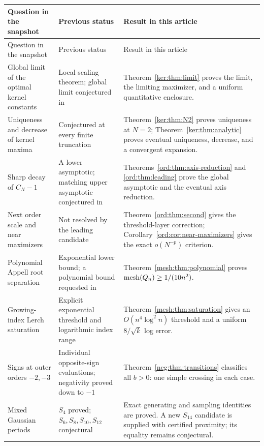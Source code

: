 \begingroup
\small
\renewcommand{\arraystretch}{1.18}
\begin{longtable}{@{}>{\raggedright\arraybackslash}p{}
 >{\raggedright\arraybackslash}p{}
 >{\raggedright\arraybackslash}p{}@{}}
\toprule
Question in the snapshot & Previous status & Result in this article\\
\midrule
\endfirsthead
\toprule
Question in the snapshot & Previous status & Result in this article\\
\midrule
\endhead
Global limit of the optimal kernel constants
& Local scaling theorem; global limit conjectured in
  \cite[Section 8]{IncomingSharp}
& Theorem~\ref{ker:thm:limit} proves the limit, the limiting maximizer,
  and a uniform quantitative enclosure.\\
Uniqueness and decrease of kernel maxima
& Conjectured at every finite truncation
& Theorem~\ref{ker:thm:N2} proves uniqueness at $N=2$;
  Theorem~\ref{ker:thm:analytic} proves eventual uniqueness,
  decrease, and a convergent expansion.\\
Sharp decay of $C_N-1$
& A lower asymptotic; matching upper asymptotic conjectured in
  \cite[Section 9]{IncomingBounds}
& Theorems~\ref{ord:thm:axis-reduction} and
  \ref{ord:thm:leading} prove the global asymptotic and the eventual
  axis reduction.\\
Next order scale and near maximizers
& Not resolved by the leading candidate
& Theorem~\ref{ord:thm:second} gives the threshold-layer correction;
  Corollary~\ref{ord:cor:near-maximizers} gives the exact
  $o(N^{-p})$ criterion.\\
Polynomial Appell root separation
& Exponential lower bound; a polynomial bound requested in
  \cite[Section 8]{IncomingUniform}
& Theorem~\ref{mesh:thm:polynomial} proves
  $\operatorname{mesh}(Q_n)\ge1/(10n^2)$.\\
Growing-index Lerch saturation
& Explicit exponential threshold and logarithmic index range
& Theorem~\ref{mesh:thm:saturation} gives an
  $O(n^4\log^2n)$ threshold and a uniform $8/\sqrt{k}$ log error.\\
Signs at outer orders $-2,-3$
& Individual opposite-sign evaluations; negativity proved down to $-1$
& Theorem~\ref{neg:thm:transitions} classifies all $b>0$:
  one simple crossing in each case.\\
Mixed Gaussian periods
& $S_4$ proved; $S_6,S_8,S_{10},S_{12}$ conjectural
& Exact generating and sampling identities are proved.
  A new $S_{14}$ candidate is supplied with certified proximity;
  its equality remains conjectural.\\
\bottomrule
\end{longtable}
\endgroup

